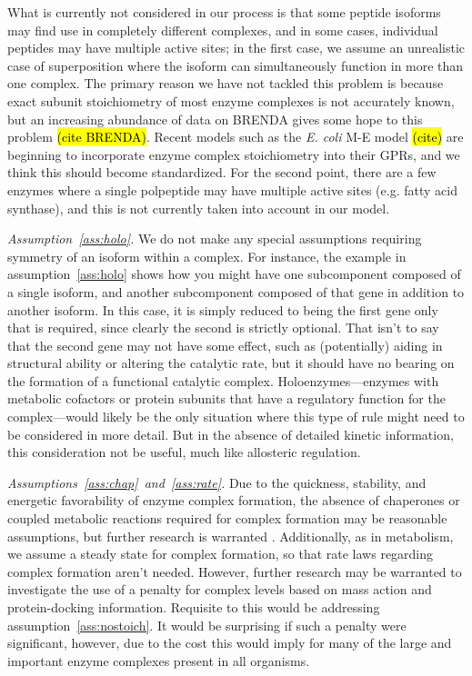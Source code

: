\begin{methods}
What is currently not considered in our
process is that some peptide isoforms may find use in completely
different complexes, and in some cases, individual peptides may
have multiple active sites; in the first case, we assume an unrealistic case of
superposition where the isoform can simultaneously function in more
than one complex. The primary reason we have not tackled this problem
is because exact subunit stoichiometry of most enzyme complexes is not
accurately known, but an increasing abundance of data on BRENDA gives
some hope to this problem \hl{(cite BRENDA)}. Recent models such as the 
\emph{E. coli} M-E model \hl{(cite)} are beginning to incorporate 
enzyme complex stoichiometry into their GPRs, and we think this should
become standardized. For the second point, there are a
few enzymes where a single polpeptide may have multiple active sites
(e.g. fatty acid synthase), and this is not currently taken into 
account in our model. 

\emph{Assumption~\ref{ass:holo}.}
We do not make any special assumptions requiring symmetry of an isoform
within a complex. For instance, the example in
assumption~\ref{ass:holo} shows how you might have one
subcomponent composed of a single isoform, and another subcomponent
composed of that gene in addition to another isoform. In this case, it
is simply reduced to being the first gene only that is required, since
clearly the second is strictly optional. That isn't to say that the
second gene may not have some effect, such as (potentially) aiding in
structural ability or altering the catalytic rate, but it should have
no bearing on the formation of a functional catalytic
complex. Holoenzymes---enzymes with metabolic cofactors or protein
subunits that have a regulatory function for the complex---would
likely be the only situation where this type of rule might need to be
considered in more detail. But in the absence of detailed kinetic
information, this consideration not be useful, much like allosteric
regulation.

\emph{Assumptions~\ref{ass:chap}~and~\ref{ass:rate}.}
Due to the quickness, stability, and energetic favorability of enzyme
complex formation, the absence of chaperones or coupled metabolic
reactions required for complex formation may be reasonable
assumptions, but further research is warranted \cite{Karr2012}.
Additionally, as in metabolism, we assume a steady state for complex
formation, so that rate laws regarding complex formation aren't
needed. However, further research may be warranted to investigate the
use of a penalty for complex levels based on mass action and
protein-docking information. Requisite to this would be addressing
assumption~\ref{ass:nostoich}. It would be surprising if such a
penalty were significant, however, due to the cost this would imply
for many of the large and important enzyme complexes present in all
organisms.


\end{methods}
